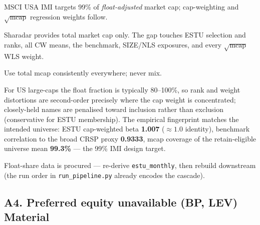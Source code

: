 \documentclass[11pt,a4paper]{article}
\newcommand{\WARN}[1]{\textcolor{warn}{\textbf{#1}}}
\begin{document}
\begin{description}[style=nextline]
  \item[USE4] MSCI USA IMI targets 99\% of \emph{float-adjusted} market cap;
    cap-weighting and $\sqrt{\text{mcap}}$ regression weights follow.
  \item[Deviation] Sharadar provides total market cap only. The gap touches
    ESTU selection and ranks, all CW means, the benchmark, SIZE/NLS exposures,
    and every $\sqrt{\text{mcap}}$ WLS weight.
  \item[Solution] Use total mcap consistently everywhere; never mix.
  \item[Validity] For US large-caps the float fraction is typically 80--100\%,
    so rank and weight distortions are second-order precisely where the cap
    weight is concentrated; closely-held names are penalised toward inclusion
    rather than exclusion (conservative for ESTU membership). The empirical
    fingerprint matches the intended universe: ESTU cap-weighted beta
    \textbf{1.007} ($\approx 1.0$ identity), benchmark correlation to the broad
    CRSP proxy \textbf{0.9333}, mcap coverage of the retain-eligible universe
    mean \textbf{99.3\%} --- the 99\% IMI design target.
  \item[Revisit when] Float-share data is procured --- re-derive
    \texttt{estu\_monthly}, then rebuild downstream (the run order in
    \texttt{run\_pipeline.py} already encodes the cascade).
\end{description}

\subsection{A4. Preferred equity unavailable (BP, LEV) \hfill \WARN{Material}}
\end{document}
